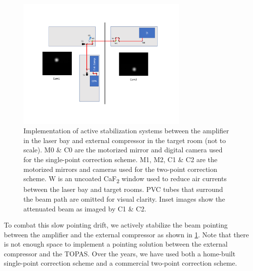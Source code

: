 \begin{figure}
	\centering
	\includegraphics[width=0.75\textwidth]{figures/chap2/guidestar_geometry.pdf}
	\caption{Implementation of active stabilization systems between the amplifier in the laser bay and external compressor in the target room (not to scale). M0 \& C0 are the motorized mirror and digital camera used for the single-point correction scheme. M1, M2, C1 \& C2 are the motorized mirrors and cameras used for the two-point correction scheme. W is an uncoated CaF\textsubscript{2} window used to reduce air currents between the laser bay and target rooms. PVC tubes that surround the beam path are omitted for visual clarity. Inset images show the attenuated beam as imaged by C1 \& C2.}
	\label{fig:guidestar_geometry}
\end{figure}

To combat this slow pointing drift, we actively stabilize the beam pointing between the amplifier and the external compressor as shown in \cref{fig:guidestar_geometry}. Note that there is not enough space to implement a pointing solution between the external compressor and the TOPAS. Over the years, we have used both a home-built single-point correction scheme and a commercial two-point correction scheme.

